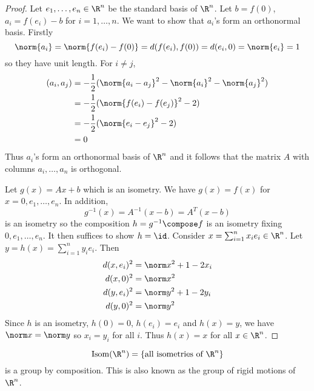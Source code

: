 \documentclass[a4paper]{article}
\theoremstyle{definition}
\DeclareMathOperator{\Isom}{Isom}
\begin{document}
\begin{proof}
  Let \(e_1, \dots, e_n \in \R^n\) be the standard basis of \(\R^n\). Let \(b = f(0)\), \(a_i = f(e_i) - b\) for \(i = 1, \dots, n\). We want to show that \(a_i\)'s form an orthonormal basis. Firstly
  \[
    \norm{a_i} = \norm{f(e_i) - f(0)} = d(f(e_i), f(0)) = d(e_i, 0) = \norm{e_i} = 1
  \]
  so they have unit length. For \(i \neq j\),
  \begin{align*}
    (a_i, a_j) &= -\frac{1}{2}(\norm{a_i - a_j}^2 - \norm{a_i}^2 - \norm{a_j}^2) \\
               &= -\frac{1}{2}(\norm{f(e_i) - f(e_j)}^2 - 2) \\
               &= -\frac{1}{2}(\norm{e_i - e_j}^2 - 2) \\
               &= 0
  \end{align*}
  Thus \(a_i\)'s form an orthonormal basis of \(\R^n\) and it follows that the matrix \(A\) with columns \(a_i, \dots, a_n\) is orthogonal.

  Let \(g(x) = Ax + b\) which is an isometry. We have \(g(x) = f(x)\) for \(x = 0, e_1, \dots, e_n\). In addition,
  \[
    g^{-1}(x) = A^{-1}(x - b) = A^T(x - b)
  \]
  is an isometry so the composition \(h = g^{-1} \compose f\) is an isometry fixing \(0, e_1, \dots, e_n\). It then suffices to show \(h = \id\). Consider \(x = \sum_{i = 1}^n x_ie_i \in \R^n\). Let \(y = h(x) = \sum_{i = 1}^n y_ie_i\). Then
\begin{align*}
  d(x, e_i)^2 &= \norm x^2 + 1 - 2x_i \\
  d(x, 0)^2 &= \norm x^2 \\
  d(y, e_i)^2 &= \norm y^2 + 1 - 2y_i \\
  d(y, 0)^2 &= \norm y^2
\end{align*}
Since \(h\) is an isometry, \(h(0) = 0\), \(h(e_i) = e_i\) and \(h(x) = y\), we have \(\norm x = \norm y\) so \(x_i = y_i\) for all \(i\). Thus \(h(x) = x\) for all \(x \in \R^n\).
\end{proof}

\begin{remark}
  \[
    \Isom(\R^n) = \{\text{all isometries of } \R^n\}
  \]
  is a group by composition. This is also known as the group of rigid motions of \(\R^n\).
\end{remark}
\end{document}
